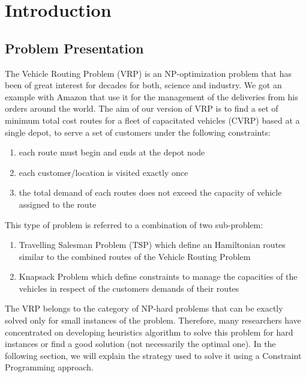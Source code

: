 \chapter{Introduction}
\section{Problem Presentation}
The Vehicle Routing Problem (VRP) is an NP-optimization problem that has been of great interest for decades for both, science and industry. We got an example with Amazon that use it for the management of the deliveries from his orders around the world. The aim of our version of VRP is to find a set of minimum total cost routes for a fleet of capacitated vehicles (CVRP) based at a single depot, to serve a set of customers under the following constraints:
\begin{enumerate}
    \item each route must begin and ends at the depot node
    \item each customer/location is visited exactly once
    \item the total demand of each routes does not exceed the capacity of vehicle assigned to the route
\end{enumerate}
This type of problem is referred to a combination of two sub-problem:
\begin{enumerate}
    \item Travelling Salesman Problem (TSP) which define an Hamiltonian routes similar to the combined routes of the Vehicle Routing Problem
    \item Knapsack Problem which define constraints to manage the capacities of the vehicles in respect of the customers demands of their routes
\end{enumerate}
The VRP belongs to the category of NP-hard problems that can be exactly solved only for small instances of the problem. Therefore, many researchers have concentrated on developing heuristics algorithm to solve this problem for hard instances or find a good solution (not necessarily the optimal one). In the following section, we will explain the strategy used to solve it using a Constraint Programming approach.
\newpage
